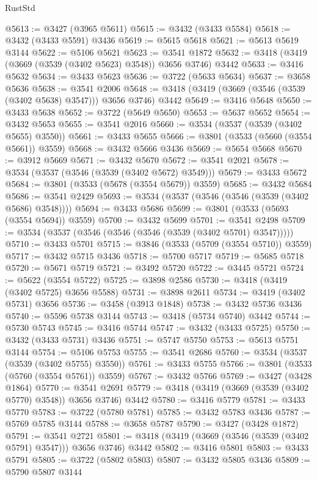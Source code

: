 \begin{lexlean}{RustStd}
\begin{coremodule}
@5613 := @3427 (@3965 @5611)
@5615 := @3432 (@3433 @5584)
@5618 := @3432 (@3433 @5591) @3436
@5619 := @5615 @5618
@5621 := @5613 @5619 @3144
@5622 := @5106 @5621
@5623 := @3541 @1872
@5632 := @3418 (@3419 (@3669 (@3539 (@3402 @5623) @3548)) @3656 @3746) @3442
@5633 := @3416 @5632
@5634 := @3433 @5623
@5636 := @3722 (@5633 @5634)
@5637 := @3658 @5636
@5638 := @3541 @2006
@5648 := @3418 (@3419 (@3669 (@3546 (@3539 (@3402 @5638) @3547))) @3656 @3746) @3442
@5649 := @3416 @5648
@5650 := @3433 @5638
@5652 := @3722 (@5649 @5650)
@5653 := @5637 @5652
@5654 := @3432 @5653
@5655 := @3541 @2016
@5660 := @3534 (@3537 (@3539 (@3402 @5655) @3550))
@5661 := @3433 @5655
@5666 := @3801 (@3533 (@5660 (@3554 @5661)) @3559)
@5668 := @3432 @5666 @3436
@5669 := @5654 @5668
@5670 := @3912 @5669
@5671 := @3432 @5670
@5672 := @3541 @2021
@5678 := @3534 (@3537 (@3546 (@3539 (@3402 @5672) @3549)))
@5679 := @3433 @5672
@5684 := @3801 (@3533 (@5678 (@3554 @5679)) @3559)
@5685 := @3432 @5684
@5686 := @3541 @2429
@5693 := @3534 (@3537 (@3546 (@3546 (@3539 (@3402 @5686) @3548))))
@5694 := @3433 @5686
@5699 := @3801 (@3533 (@5693 (@3554 @5694)) @3559)
@5700 := @3432 @5699
@5701 := @3541 @2498
@5709 := @3534 (@3537 (@3546 (@3546 (@3546 (@3539 (@3402 @5701) @3547)))))
@5710 := @3433 @5701
@5715 := @3846 (@3533 (@5709 (@3554 @5710)) @3559)
@5717 := @3432 @5715 @3436
@5718 := @5700 @5717
@5719 := @5685 @5718
@5720 := @5671 @5719
@5721 := @3492 @5720
@5722 := @3445 @5721
@5724 := @5622 (@3554 @5722)
@5725 := @3898 @2586
@5730 := @3418 (@3419 (@3402 @5725) @3656 @5588)
@5731 := @3898 @2611
@5734 := @3419 (@3402 @5731) @3656
@5736 := @3458 (@3913 @1848)
@5738 := @3432 @5736 @3436
@5740 := @5596 @5738 @3144
@5743 := @3418 (@5734 @5740) @3442
@5744 := @5730 @5743
@5745 := @3416 @5744
@5747 := @3432 (@3433 @5725)
@5750 := @3432 (@3433 @5731) @3436
@5751 := @5747 @5750
@5753 := @5613 @5751 @3144
@5754 := @5106 @5753
@5755 := @3541 @2686
@5760 := @3534 (@3537 (@3539 (@3402 @5755) @3550))
@5761 := @3433 @5755
@5766 := @3801 (@3533 (@5760 (@3554 @5761)) @3559)
@5767 := @3432 @5766
@5769 := @3427 (@3428 @1864)
@5770 := @3541 @2691
@5779 := @3418 (@3419 (@3669 (@3539 (@3402 @5770) @3548)) @3656 @3746) @3442
@5780 := @3416 @5779
@5781 := @3433 @5770
@5783 := @3722 (@5780 @5781)
@5785 := @3432 @5783 @3436
@5787 := @5769 @5785 @3144
@5788 := @3658 @5787
@5790 := @3427 (@3428 @1872)
@5791 := @3541 @2721
@5801 := @3418 (@3419 (@3669 (@3546 (@3539 (@3402 @5791) @3547))) @3656 @3746) @3442
@5802 := @3416 @5801
@5803 := @3433 @5791
@5805 := @3722 (@5802 @5803)
@5807 := @3432 @5805 @3436
@5809 := @5790 @5807 @3144

\end{coremodule}
\end{lexlean}

